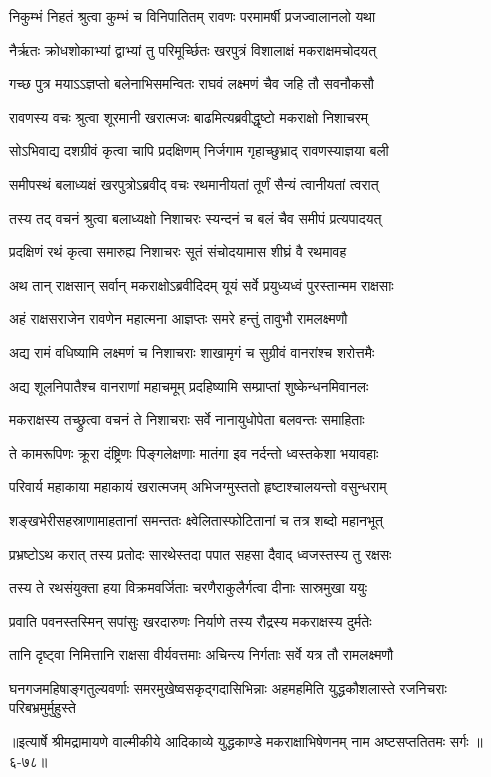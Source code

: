 
\twolineshloka
{निकुम्भं निहतं श्रुत्वा कुम्भं च विनिपातितम्}
{रावणः परमामर्षी प्रजज्वालानलो यथा} %

\twolineshloka
{नैर्ऋतः क्रोधशोकाभ्यां द्वाभ्यां तु परिमूर्च्छितः}
{खरपुत्रं विशालाक्षं मकराक्षमचोदयत्} %

\twolineshloka
{गच्छ पुत्र मयाऽऽज्ञप्तो बलेनाभिसमन्वितः}
{राघवं लक्ष्मणं चैव जहि तौ सवनौकसौ} %

\twolineshloka
{रावणस्य वचः श्रुत्वा शूरमानी खरात्मजः}
{बाढमित्यब्रवीद्धृष्टो मकराक्षो निशाचरम्} %

\twolineshloka
{सोऽभिवाद्य दशग्रीवं कृत्वा चापि प्रदक्षिणम्}
{निर्जगाम गृहाच्छुभ्राद् रावणस्याज्ञया बली} %

\twolineshloka
{समीपस्थं बलाध्यक्षं खरपुत्रोऽब्रवीद् वचः}
{रथमानीयतां तूर्णं सैन्यं त्वानीयतां त्वरात्} %

\twolineshloka
{तस्य तद् वचनं श्रुत्वा बलाध्यक्षो निशाचरः}
{स्यन्दनं च बलं चैव समीपं प्रत्यपादयत्} %

\twolineshloka
{प्रदक्षिणं रथं कृत्वा समारुह्य निशाचरः}
{सूतं संचोदयामास शीघ्रं वै रथमावह} %

\twolineshloka
{अथ तान् राक्षसान् सर्वान् मकराक्षोऽब्रवीदिदम्}
{यूयं सर्वे प्रयुध्यध्वं पुरस्तान्मम राक्षसाः} %

\twolineshloka
{अहं राक्षसराजेन रावणेन महात्मना}
{आज्ञप्तः समरे हन्तुं तावुभौ रामलक्ष्मणौ} %

\twolineshloka
{अद्य रामं वधिष्यामि लक्ष्मणं च निशाचराः}
{शाखामृगं च सुग्रीवं वानरांश्च शरोत्तमैः} %

\twolineshloka
{अद्य शूलनिपातैश्च वानराणां महाचमूम्}
{प्रदहिष्यामि सम्प्राप्तां शुष्केन्धनमिवानलः} %

\twolineshloka
{मकराक्षस्य तच्छ्रुत्वा वचनं ते निशाचराः}
{सर्वे नानायुधोपेता बलवन्तः समाहिताः} %

\twolineshloka
{ते कामरूपिणः क्रूरा दंष्ट्रिणः पिङ्गलेक्षणाः}
{मातंगा इव नर्दन्तो ध्वस्तकेशा भयावहाः} %

\twolineshloka
{परिवार्य महाकाया महाकायं खरात्मजम्}
{अभिजग्मुस्ततो हृष्टाश्चालयन्तो वसुन्धराम्} %

\twolineshloka
{शङ्खभेरीसहस्राणामाहतानां समन्ततः}
{क्ष्वेलितास्फोटितानां च तत्र शब्दो महानभूत्} %

\twolineshloka
{प्रभ्रष्टोऽथ करात् तस्य प्रतोदः सारथेस्तदा}
{पपात सहसा दैवाद् ध्वजस्तस्य तु रक्षसः} %

\twolineshloka
{तस्य ते रथसंयुक्ता हया विक्रमवर्जिताः}
{चरणैराकुलैर्गत्वा दीनाः सास्रमुखा ययुः} %

\twolineshloka
{प्रवाति पवनस्तस्मिन् सपांसुः खरदारुणः}
{निर्याणे तस्य रौद्रस्य मकराक्षस्य दुर्मतेः} %

\twolineshloka
{तानि दृष्ट्वा निमित्तानि राक्षसा वीर्यवत्तमाः}
{अचिन्त्य निर्गताः सर्वे यत्र तौ रामलक्ष्मणौ} %

\twolineshloka
{घनगजमहिषाङ्गतुल्यवर्णाः समरमुखेष्वसकृद्गदासिभिन्नाः}
{अहमहमिति युद्धकौशलास्ते रजनिचराः परिबभ्रमुर्मुहुस्ते} %


॥इत्यार्षे श्रीमद्रामायणे वाल्मीकीये आदिकाव्ये युद्धकाण्डे मकराक्षाभिषेणनम् नाम अष्टसप्ततितमः सर्गः ॥६-७८॥
